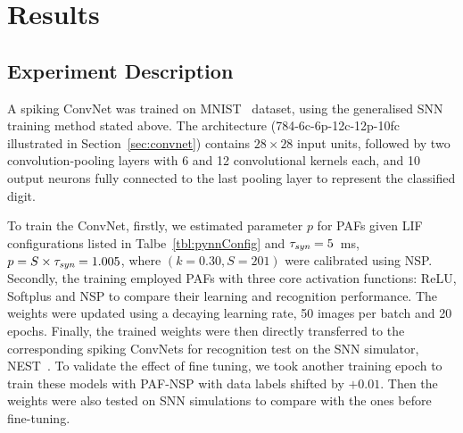 \section{Results}
\label{sec:iconipResult}
	\DIFaddbegin {}

	\DIFaddend \subsection{Experiment Description}
	\DIFaddbegin \label{subsec:expDesr}
	\DIFaddend %
	A spiking ConvNet was trained on \DIFaddbegin {}\DIFaddend MNIST~\citep{lecun1998gradient} dataset, 
	using the generalised SNN training method stated above.
	The architecture (784-6c-6p-12c-12p-10fc illustrated in Section~\ref{sec:convnet}) contains $28\times28$ input units, followed by two convolution-pooling layers with 6 and 12 convolutional kernels each, and 10 output neurons fully connected to the last pooling layer to represent the classified digit.

	To train the ConvNet, firstly, we estimated parameter $p$ for PAFs given LIF configurations listed in Talbe~\ref{tbl:pynnConfig} and $\tau_{\textit{\textrm{syn}}}=5$~ms, $p = S \times \tau_{\textit{\textrm{syn}}} = 1.005$, where $(k=0.30, S=201)$ were calibrated using NSP. 
	Secondly, the training employed PAFs with three core activation functions: ReLU, Softplus and NSP to compare their learning and recognition performance.
	The weights were updated using a decaying learning rate, 50 images per batch and 20 epochs.
	Finally, the trained weights were then directly transferred to the corresponding spiking ConvNets for recognition test on the SNN simulator, NEST~\citep{gewaltig2007nest}.
	To validate the effect of fine tuning, we took another training epoch to train these models with PAF-NSP with data labels shifted by $+0.01$.
	Then the weights were also tested on SNN simulations to compare with the ones before fine-tuning.

